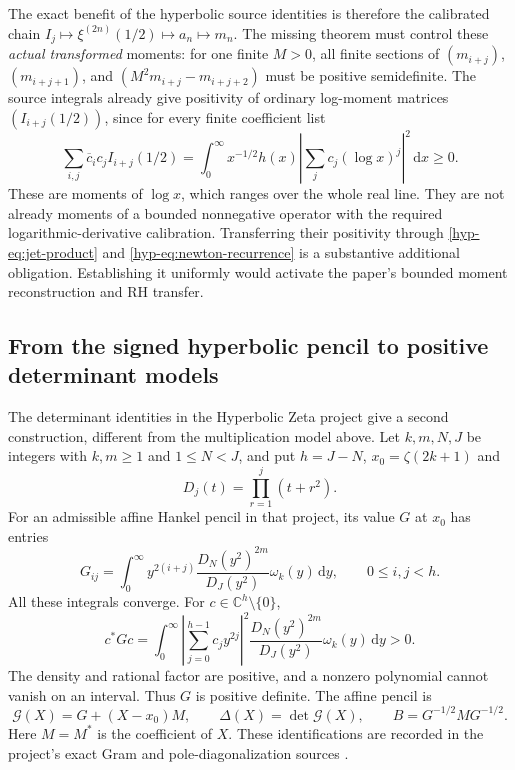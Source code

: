 \documentclass[11pt,a4paper]{article}
\numberwithin{equation}{section}
\theoremstyle{definition}
\theoremstyle{remark}
\newcommand{\C}{\mathbb C}
\newcommand{\dd}{\,\mathrm d}
\begin{document}
The exact benefit of the hyperbolic source identities is therefore
the calibrated chain
$I_j\longmapsto\xi^{(2n)}(1/2)\longmapsto a_n\longmapsto m_n$.
The missing theorem must control these \emph{actual transformed}
moments: for one finite $M>0$, all finite sections of
$(m_{i+j})$, $(m_{i+j+1})$, and
$(M^2m_{i+j}-m_{i+j+2})$ must be positive semidefinite.
The source integrals already give positivity of ordinary
log-moment matrices $(I_{i+j}(1/2))$, since for every finite
coefficient list
\[
\sum_{i,j}\overline c_i c_j I_{i+j}(1/2)
=\int_0^\infty x^{-1/2}h(x)
\left|\sum_jc_j(\log x)^j\right|^2\,\mathrm dx\geq0.
\]
These are moments of $\log x$, which ranges over the whole real
line. They are not already moments of a bounded nonnegative
operator with the required logarithmic-derivative calibration.
Transferring their positivity
through \eqref{hyp-eq:jet-product} and
\eqref{hyp-eq:newton-recurrence} is a substantive additional
obligation. Establishing it uniformly would activate the paper's
bounded moment reconstruction and RH transfer.


\subsection{From the signed hyperbolic pencil to positive determinant models}
\label{subsec:hyp-pencil}

The determinant identities in the Hyperbolic Zeta project give a second
construction, different from the multiplication model above. Let
$k,m,N,J$ be integers with $k,m\geq1$ and $1\leq N<J$, and put
$h=J-N$, $x_0=\zeta(2k+1)$ and
\[
D_j(t)=\prod_{r=1}^{j}(t+r^2).
\]
For an admissible affine Hankel pencil in that project, its value $G$
at $x_0$ has entries
\begin{equation}\label{eq:hyp-pencil-gram}
G_{ij}=\int_0^\infty y^{2(i+j)}
  \frac{D_N(y^2)^{2m}}{D_J(y^2)}\omega_k(y)\dd y,
\qquad 0\leq i,j<h.
\end{equation}
All these integrals converge. For $c\in\C^h\setminus\{0\}$,
\[
c^*Gc=\int_0^\infty
 \left|\sum_{j=0}^{h-1}c_j y^{2j}\right|^2
 \frac{D_N(y^2)^{2m}}{D_J(y^2)}\omega_k(y)\dd y>0.
\]
The density and rational factor are positive, and a nonzero polynomial
cannot vanish on an interval. Thus $G$ is positive definite.
The affine pencil is
\begin{equation}\label{eq:hyp-affine-pencil}
\mathcal G(X)=G+(X-x_0)M,\qquad
\Delta(X)=\det\mathcal G(X),\qquad
B=G^{-1/2}MG^{-1/2}.
\end{equation}
Here $M=M^*$ is the coefficient of $X$. These identifications are
recorded in the project's exact Gram and pole-diagonalization sources
\cite{hyp-gram,hyp-signs}.
\end{document}
